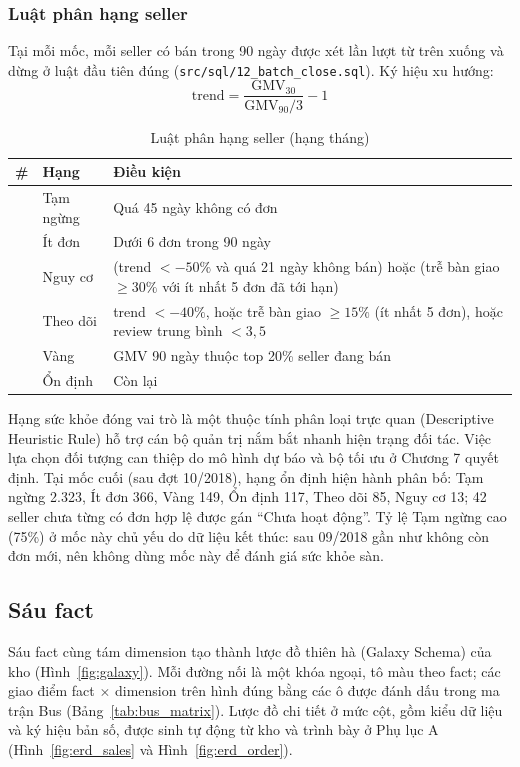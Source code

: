 \subsubsection*{Luật phân hạng seller}
Tại mỗi mốc, mỗi seller có bán trong 90 ngày được xét lần lượt từ trên xuống và dừng ở luật đầu tiên đúng (\texttt{src/sql/12\_batch\_close.sql}). Ký hiệu xu hướng:
\begin{equation}
\text{trend} = \frac{\text{GMV}_{30}}{\text{GMV}_{90}/3} - 1
\end{equation}

\begin{table}[htbp]
\centering
\small
\caption{Luật phân hạng seller (hạng tháng)}
\label{tab:tier_rules}
\begin{tabularx}{\textwidth}{|>{\centering\arraybackslash}m{0.6cm}|>{\raggedright\arraybackslash}m{2.1cm}|L|}
\hline
\textbf{\#} & \textbf{Hạng} & \textbf{Điều kiện} \\
 & Tạm ngừng & Quá 45 ngày không có đơn \\
 & Ít đơn & Dưới 6 đơn trong 90 ngày \\
 & Nguy cơ & (trend $< -50\%$ và quá 21 ngày không bán) hoặc (trễ bàn giao $\ge 30\%$ với ít nhất 5 đơn đã tới hạn) \\
 & Theo dõi & trend $< -40\%$, hoặc trễ bàn giao $\ge 15\%$ (ít nhất 5 đơn), hoặc review trung bình $< 3{,}5$ \\
 & Vàng & GMV 90 ngày thuộc top 20\% seller đang bán \\
 & Ổn định & Còn lại \\
\hline
\end{tabularx}
\end{table}

Hạng sức khỏe đóng vai trò là một thuộc tính phân loại trực quan (Descriptive Heuristic Rule) hỗ trợ cán bộ quản trị nắm bắt nhanh hiện trạng đối tác. Việc lựa chọn đối tượng can thiệp do mô hình dự báo và bộ tối ưu ở Chương 7 quyết định. Tại mốc cuối (sau đợt 10/2018), hạng ổn định hiện hành phân bố: Tạm ngừng 2.323, Ít đơn 366, Vàng 149, Ổn định 117, Theo dõi 85, Nguy cơ 13; 42 seller chưa từng có đơn hợp lệ được gán ``Chưa hoạt động''. Tỷ lệ Tạm ngừng cao (75\%) ở mốc này chủ yếu do dữ liệu kết thúc: sau 09/2018 gần như không còn đơn mới, nên không dùng mốc này để đánh giá sức khỏe sàn.

\subsection{Sáu fact}
Sáu fact cùng tám dimension tạo thành lược đồ thiên hà (Galaxy Schema) của kho (Hình~\ref{fig:galaxy}). Mỗi đường nối là một khóa ngoại, tô màu theo fact; các giao điểm fact $\times$ dimension trên hình đúng bằng các ô được đánh dấu trong ma trận Bus (Bảng~\ref{tab:bus_matrix}). Lược đồ chi tiết ở mức cột, gồm kiểu dữ liệu và ký hiệu bản số, được sinh tự động từ kho và trình bày ở Phụ lục A (Hình~\ref{fig:erd_sales} và Hình~\ref{fig:erd_order}).

